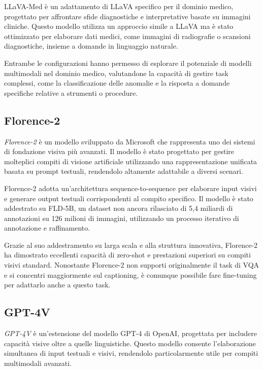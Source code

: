 \documentclass[../main.tex]{subfiles}
\begin{document}
LLaVA-Med \cite{li2023llavamedtraininglargelanguageandvision} è un adattamento di LLaVA specifico per il dominio medico, progettato per affrontare sfide diagnostiche e interpretative basate su immagini cliniche. Questo modello utilizza un approccio simile a LLaVA ma è stato ottimizzato per elaborare dati medici, come immagini di radiografie o scansioni diagnostiche, insieme a domande in linguaggio naturale.

Entrambe le configurazioni hanno permesso di esplorare il potenziale di modelli multimodali nel dominio medico, valutandone la capacità di gestire task complessi, come la classificazione delle anomalie e la risposta a domande specifiche relative a strumenti o procedure.

\subsection{Florence-2}

\textit{Florence-2} \cite{xiao2023florence2advancingunifiedrepresentation} è un modello sviluppato da Microsoft che rappresenta uno dei sistemi di fondazione visiva più avanzati. Il modello è stato progettato per gestire molteplici compiti di visione artificiale utilizzando una rappresentazione unificata basata su prompt testuali, rendendolo altamente adattabile a diversi scenari.

Florence-2 adotta un'architettura sequence-to-sequence per elaborare input visivi e generare output testuali corrispondenti al compito specifico. Il modello è stato addestrato su FLD-5B, un dataset non ancora rilasciato di 5,4 miliardi di annotazioni su 126 milioni di immagini, utilizzando un processo iterativo di annotazione e raffinamento.

Grazie al suo addestramento su larga scala e alla struttura innovativa, Florence-2 ha dimostrato eccellenti capacità di zero-shot e prestazioni superiori su compiti visivi standard. Nonostante Florence-2 non supporti originalmente il task di VQA e si concentri maggiormente sul captioning, è comunque possibile fare fine-tuning per adattarlo anche a questo task.

\subsection{GPT-4V}

\textit{GPT-4V} \cite{2023GPT4VisionSC} è un'estensione del modello GPT-4 di OpenAI, progettata per includere capacità visive oltre a quelle linguistiche. Questo modello consente l'elaborazione simultanea di input testuali e visivi, rendendolo particolarmente utile per compiti multimodali avanzati.
\end{document}
